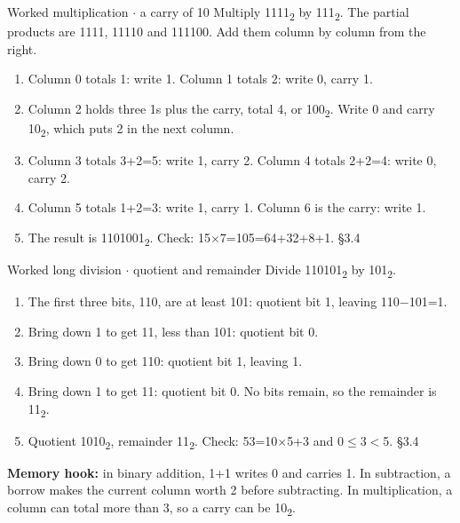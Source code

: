 \documentclass[11pt]{article}
\begin{document}
\begin{keepsection}
\begin{keepsection}
\begin{workedbox}{Worked multiplication \ensuremath{\cdot} a carry of 10}
Multiply 1111\textsubscript{2} by 111\textsubscript{2}. The partial products are 1111, 11110 and 111100. Add them column by column from the right.

\begin{enumerate}
\item Column 0 totals 1: write 1. Column 1 totals 2: write 0, carry 1.
\item Column 2 holds three 1s plus the carry, total 4, or 100\textsubscript{2}. Write 0 and carry 10\textsubscript{2}, which puts 2 in the next column.
\item Column 3 totals 3+2=5: write 1, carry 2. Column 4 totals 2+2=4: write 0, carry 2.
\item Column 5 totals 1+2=3: write 1, carry 1. Column 6 is the carry: write 1.
\item The result is 1101001\textsubscript{2}. Check: 15\ensuremath{\times}7=105=64+32+8+1. \hfill{\small\color{FAUblue}§3.4}
\end{enumerate}
\end{workedbox}

\begin{workedbox}{Worked long division \ensuremath{\cdot} quotient and remainder}
Divide 110101\textsubscript{2} by 101\textsubscript{2}.

\begin{enumerate}
\item The first three bits, 110, are at least 101: quotient bit 1, leaving 110\ensuremath{-}101=1.
\item Bring down 1 to get 11, less than 101: quotient bit 0.
\item Bring down 0 to get 110: quotient bit 1, leaving 1.
\item Bring down 1 to get 11: quotient bit 0. No bits remain, so the remainder is 11\textsubscript{2}.
\item Quotient 1010\textsubscript{2}, remainder 11\textsubscript{2}. Check: 53=10\ensuremath{\times}5+3 and 0\ensuremath{\leq}3\ensuremath{<}5. \hfill{\small\color{FAUblue}§3.4}
\end{enumerate}
\end{workedbox}

\begin{notebox}\textbf{Memory hook:} in binary addition, 1+1 writes 0 and carries 1. In subtraction, a borrow makes the current column worth 2 before subtracting. In multiplication, a column can total more than 3, so a carry can be 10\textsubscript{2}.\end{notebox}


\end{keepsection}
\end{keepsection}
\end{document}
